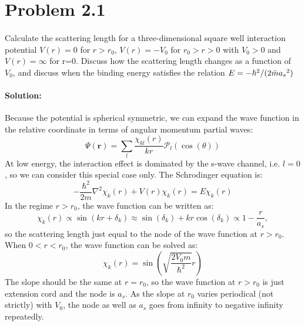 \def\ahf{\alpha_{\mathrm{hf}}}
\def\muB{\mu_{\mathrm{B}}}
\def\gS{g_{\mathrm{S}}}
\def\muN{\mu_{\mathrm{N}}}
\def\gI{g_{\mathrm{I}}}

\section*{Problem 2.1}
\paragraph{} Calculate the scattering length for a three-dimensional square well interaction potential $V(r) = 0$ for $r>r_0$, $V(r) = -V_0$ for $r_0 > r>0$ with $V_0>0$ and $V(r) = \infty$ for r=0. Discuss how the scattering length changes as a function of $V_0$, and discuss when the binding energy satisfies the relation $E = -\hbar^{2}/(2\Bar{m} {a_s}^2)$
\paragraph{Solution:} 
Because the potential is spherical symmetric, we can expand the wave function in the relative coordinate in terms of angular momentum partial waves:
\begin{equation}
    \Psi(\bm{r}) = \sum_l \frac{\chi_{kl}(r)}{k r}\mathcal{P}_l(\cos(\theta))
\end{equation}
At low energy, the interaction effect is dominated by the s-wave channel, i.e. $l = 0$, so we can consider this special case only. The Schrodinger equation is:
\begin{equation}
    -\frac{\hbar^2}{2m}\nabla^2 \chi_k(r) + V(r) \chi_k(r) = E \chi_k(r)
\end{equation}
In the regime $r>r_0$, the wave function can be written as:
\begin{equation}
    \chi_k(r) \propto \sin(k r + \delta_k) \approx \sin(\delta_k) + k r \cos(\delta_k) \propto 1-\frac{r}{a_s},
\end{equation}
so the scattering length just equal to the node of the wave function at $r>r_0$.
When $0<r<r_0$, the wave function can be solved as:
\begin{equation}
    \chi_k(r) = \sin(\sqrt{\frac{2V_0m}{\hbar^2}}r)
\end{equation}
The slope should be the same at $r = r_0$,
so the wave function at $r>r_0$ is just extension cord and the node is $a_s$. As the slope at $r_0$ varies periodical (not strictly) with $V_0$, the node as well as $a_s$ goes from infinity to negative infinity repeatedly. 
